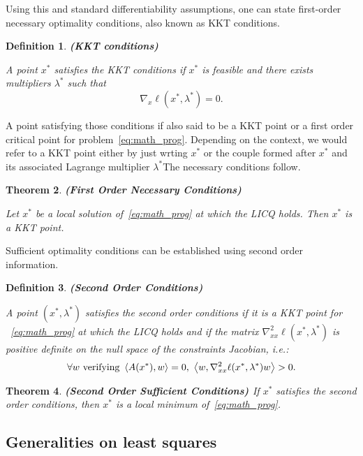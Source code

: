\documentclass[10pt]{article}
\newtheorem{theorem}{Theorem}[]
\newtheorem{definition}[theorem]{Definition}
\numberwithin{equation}{section}
\begin{document}
	Using this and standard differentiability assumptions, one can state first-order necessary optimality conditions, also known as KKT conditions. 
	
	\begin{definition}\label{def:kkt_point}
		\textbf{(KKT conditions)}
		
		A point $x^*$ satisfies the KKT conditions if $x^* $ is feasible and there exists multipliers \(\lambda^*\) such that \[\nabla_x \ell (x^*,\lambda^*)=0.\]
	\end{definition}
	
	
	A point satisfying those conditions if also said to be a KKT point or a first order critical point for problem~\eqref{eq:math_prog}. Depending on the context, we would refer to a KKT point either by just wrting $x^*$ or the couple formed after $x^*$ and its associated Lagrange multiplier $\lambda^*$The necessary conditions follow.
	
	\begin{theorem}\label{theo:fonc}
		\textbf{(First Order Necessary Conditions)\cite[][Theorem 12.1]{nocedalwright:2006}}
		
		Let $x^*$ be a local solution of~\eqref{eq:math_prog} at which the LICQ holds. Then $x^*$ is a KKT point.
	\end{theorem}
	
	Sufficient optimality conditions can be established using second order information.
	
	\begin{definition}\label{def:soc}
		\textbf{(Second Order Conditions)}
		
		A point $(x^*,\lambda^*)$ satisfies the second order conditions if it is a KKT point for ~\eqref{eq:math_prog} at which the LICQ holds and if the matrix $\nabla_{xx}^2\ell(x^*,\lambda^*)$ is positive definite on the null space of the constraints Jacobian, i.e.:
		\[\forall w \text{ verifying } \left\langle {A(x^*)} , {w} \right\rangle=0,\ \left\langle {w} , {\nabla_{xx}^2\ell(x^*,\lambda^*)w} \right\rangle > 0.\]
	\end{definition}
	
	\begin{theorem} \textbf{(Second Order Sufficient Conditions) \cite[][Theorem 12.5]{nocedalwright:2006}}
		If $x^*$ satisfies the second order conditions, then $x^*$ is a local minimum of~\eqref{eq:math_prog}.
	\end{theorem}
	
	\subsection{Generalities on least squares}
	 
\end{document}
